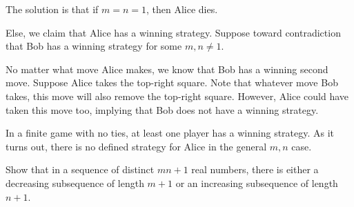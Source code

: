 \documentclass[10pt]{mypackage}
\begin{document}
\begin{solution}
  The solution is that if $m=n=1$, then Alice dies.\newline

  Else, we claim that Alice has a winning strategy. Suppose toward contradiction that Bob has a winning strategy for some $m,n\neq 1$.\newline

  No matter what move Alice makes, we know that Bob has a winning second move. Suppose Alice takes the top-right square. Note that whatever move Bob takes, this move will also remove the top-right square. However, Alice could have taken this move too, implying that Bob does not have a winning strategy.
\end{solution}
\begin{remark}
  In a finite game with no ties, at least one player has a winning strategy. As it turns out, there is no defined strategy for Alice in the general $m,n$ case.
\end{remark}
\begin{problem}
  Show that in a sequence of distinct $mn + 1$ real numbers, there is either a decreasing subsequence of length $m + 1$ or an increasing subsequence of length $n + 1$.
\end{problem}
%
\end{document}
